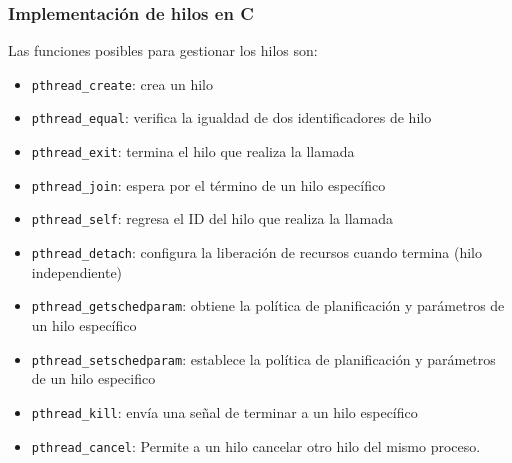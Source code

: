 \subsubsection{Implementación de hilos en C}

Las funciones posibles para gestionar los hilos son:

\begin{itemize}
	\item   \texttt{pthread\_create}: crea un hilo
	\item   \texttt{pthread\_equal}: verifica la igualdad de dos identificadores de hilo
	\item   \texttt{pthread\_exit}: termina el hilo que realiza la llamada
	\item   \texttt{pthread\_join}: espera por el término de un hilo específico
	\item   \texttt{pthread\_self}: regresa el ID del hilo que realiza la llamada
	\item   \texttt{pthread\_detach}: configura la liberación de recursos cuando termina (hilo independiente)
	\item   \texttt{pthread\_getschedparam}: obtiene la política de planificación y parámetros de un hilo específico
	\item   \texttt{pthread\_setschedparam}: establece la política de planificación y parámetros de un hilo especifico
	\item   \texttt{pthread\_kill}: envía una señal de terminar a un hilo específico
	\item   \texttt{pthread\_cancel}: Permite a un hilo cancelar otro hilo del mismo proceso.
\end{itemize} \cite*{man7-pthreads-no-date}